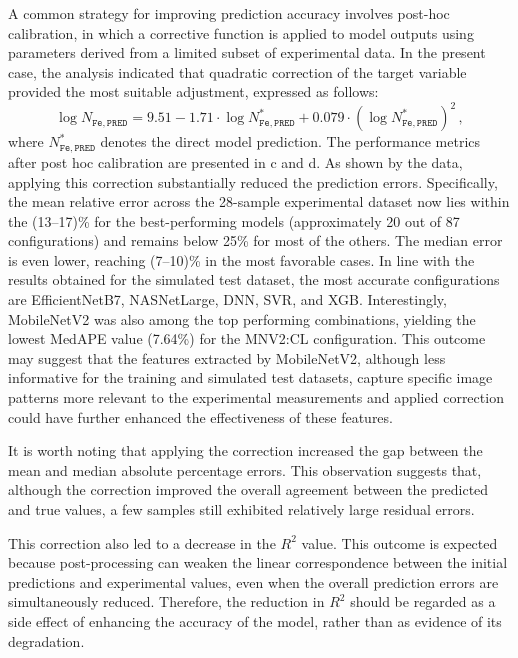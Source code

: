 \documentclass[10pt]{iopart}
\begin{document}
A common strategy for improving prediction accuracy involves post-hoc calibration,
in which a corrective function is applied to model outputs using parameters derived from a limited subset of experimental data.
In the present case, the analysis indicated that quadratic correction of the target variable provided
the most suitable adjustment, expressed as follows:
\begin{equation}\label{eqPostHoc}
  \log N_\mathtt{Fe,PRED}=9.51-1.71\cdot \log N_\mathtt{Fe,PRED}^{*} + 0.079 \cdot (\log N_\mathtt{Fe,PRED}^{*})^2\,,
\end{equation}
where $N_\mathtt{Fe,PRED}^{*}$ denotes the direct model prediction.
The performance metrics after post hoc calibration are presented in c and d.
As shown by the data, applying this correction substantially reduced the prediction errors.
Specifically, the mean relative error across the 28-sample experimental dataset now lies within the (13–17)\% 
for the best-performing models (approximately 20 out of 87 configurations) and remains below 25\% for most of the others.
The median error is even lower, reaching (7–10)\% in the most favorable cases.
In line with the results obtained for the simulated test dataset, the most accurate configurations are EfficientNetB7, NASNetLarge, DNN, SVR, and XGB.
Interestingly, MobileNetV2 was also among the top performing combinations, yielding the lowest MedAPE value (7.64\%) for the MNV2:CL configuration.
This outcome may suggest that the features extracted by MobileNetV2, although less informative for the training and simulated test datasets,
capture specific image patterns more relevant to the experimental measurements and applied correction could have further enhanced the effectiveness of these features.

It is worth noting that applying the correction increased the gap between the mean and median absolute percentage errors.
This observation suggests that, although the correction improved the overall agreement between the predicted and true values,
a few samples still exhibited relatively large residual errors.

This correction also led to a decrease in the $R^2$ value.
This outcome is expected because post-processing can weaken the linear correspondence between the initial predictions and experimental values,
even when the overall prediction errors are simultaneously reduced.
Therefore, the reduction in $R^2$ should be regarded as a side effect of enhancing the accuracy of the model,
rather than as evidence of its degradation.
\end{document}
